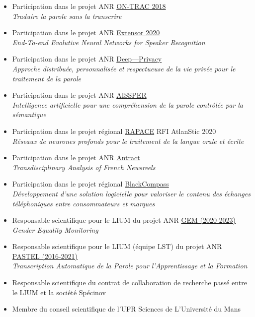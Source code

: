 \documentclass[11pt,a4paper]{article}
\begin{document}
\begin{itemize}
\item Participation dans le projet ANR \href{https://lium.univ-lemans.fr/on-trac/}{ON-TRAC 2018} \\
    \textit{Traduire la parole sans la transcrire}

\item Participation dans le projet ANR \href{https://lium.univ-lemans.fr/extensor/1}{Extensor 2020} \\
\textit{End-To-end Evolutive Neural Networks for Speaker Recognition}

\item Participation dans le projet ANR \href{https://lium.univ-lemans.fr/deep-privacy/}{Deep—Privacy} \\
\textit{Approche distribuée, personnalisée et respectueuse de la vie privée pour le traitement de la parole}

\item Participation dans le projet ANR \href{https://lium.univ-lemans.fr/aissper/}{AISSPER} \\
\textit{Intelligence artificielle pour une compréhension de la parole contrôlée par la sémantique}

\item Participation dans le projet régional \href{https://lium.univ-lemans.fr/rapace/}{RAPACE} RFI AtlanStic 2020\\
\textit{Réseaux de neurones profonds pour le traitement de la langue orale et écrite}

\item Participation dans le projet ANR \href{https://lium.univ-lemans.fr/antract/}{Antract}\\
\textit{Transdisciplinary Analysis of French Newsreels}


\item Participation dans le projet régional \href{https://lium.univ-lemans.fr/blackcompass/}{BlackCompass}\\
\textit{Développement d'une solution logicielle pour valoriser le contenu des échanges téléphoniques entre consommateurs et marques}

\item Responsable scientifique pour le LIUM du projet ANR \href{https://lium.univ-lemans.fr/gem/}{GEM (2020-2023)} \\
\textit{Gender Equality Monitoring}

\item Responsable scientifique pour le LIUM (équipe LST) du projet ANR \href{https://lium.univ-lemans.fr/pastel/}{PASTEL (2016-2021)} \\
\textit{Transcription Automatique de la Parole pour l'Apprentissage et la Formation}


\item Responsable scientifique du contrat de collaboration de recherche passé entre le LIUM et la société Spécinov

\item Membre du conseil scientifique de l'UFR Sciences de L'Université du Mans


\end{itemize}
\end{document}
